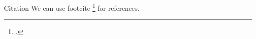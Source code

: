 

\begin{frame}{Citation}
    We can use footcite \footcite{Risius2017} for references.
    
\end{frame}